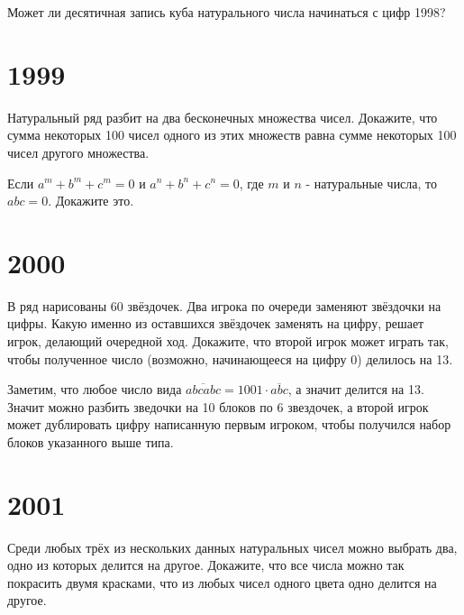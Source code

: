 \documentclass[11pt, a4paper]{common/document_template}
\begin{document}
\begin{exercise}[1662]
Может ли десятичная запись куба натурального числа начинаться с цифр 1998?
\end{exercise}

\chapter{1999}

\begin{exercise}[1667]
Натуральный ряд разбит на два бесконечных множества чисел. Докажите, что сумма некоторых 100 чисел одного из этих множеств равна сумме некоторых 100 чисел другого множества.
\end{exercise}

\begin{exercise}[1703]
Если $a^{m} + b^{m} + c^{m} = 0$ и $a^{n} + b^{n} + c^{n} = 0$, где $m$ и $n$ - натуральные числа, то $abc = 0$. Докажите это.
\end{exercise}

\chapter{2000}

\begin{exercise}[1731]
В ряд нарисованы 60 звёздочек. Два игрока по очереди заменяют звёздочки на цифры. Какую именно из оставшихся звёздочек заменять на цифру, решает игрок, делающий очередной ход. Докажите, что второй игрок может играть так, чтобы полученное число (возможно, начинающееся на цифру 0) делилось на 13.
\end{exercise}

\begin{Solution}
Заметим, что любое число вида $\overline{abcabc} = 1001 \cdot \overline{abc}$, а значит делится на 13. Значит можно разбить зведочки на 10 блоков по 6 звездочек, а второй игрок может дублировать цифру написанную первым игроком, чтобы получился набор блоков указанного выше типа. 
\end{Solution}

\chapter{2001}

\begin{exercise}[1756]
Среди любых трёх из нескольких данных натуральных чисел можно выбрать два, одно из которых делится на другое. Докажите, что все числа можно так покрасить двумя красками, что из любых чисел одного цвета одно делится на другое.
\end{exercise}
\end{document}
